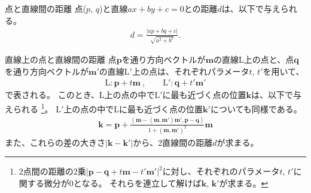 \clearpage
\begin{Formula}{点と直線間の距離}
点($p$, $q$)と直線$ax+by+c=0$との距離$d$は、以下で与えられる。
\begin{align*}
  d = \frac{|ap+bq+c|}{\sqrt{a^2+b^2}}.
\end{align*}
\end{Formula}
\begin{Formula}{直線上の点と直線間の距離}
点$\boldsymbol p$を通り方向ベクトルが$\boldsymbol m$の直線L上の点と、点$\boldsymbol q$を通り方向ベクトルが$\boldsymbol m'$の直線$\mathrm L'$上の点は、それぞれパラメータ$t$, $t'$を用いて、
\begin{align*}
  \mathrm L: \boldsymbol p+t\boldsymbol m\ , \qquad
  \mathrm L': \boldsymbol q+t'\boldsymbol m'
\end{align*}
で表される。
このとき、L上の点の中で$\mathrm L'$に最も近づく点の位置$\boldsymbol k$は、以下で与えられる
\footnote{2点間の距離の2乗$|\boldsymbol p-\boldsymbol q+t\boldsymbol m-t'\boldsymbol m'|^2$に対し、それぞれのパラメータ$t$, $t'$に関する微分が0となる。
それらを連立して解けば$\boldsymbol k$, $\boldsymbol k'$が求まる。}。
$\mathrm L'$上の点の中でLに最も近づく点の位置$\boldsymbol k'$についても同様である。
\begin{align*}
  \boldsymbol k
  = \boldsymbol p
    +\frac{(\boldsymbol m-(\boldsymbol m, \boldsymbol m')\boldsymbol m', \boldsymbol p-\boldsymbol q)}
          {1+(\boldsymbol m, \boldsymbol m')^2}\boldsymbol m
\end{align*}
また、これらの差の大きさ$\left|\boldsymbol k-\boldsymbol k'\right|$から、2直線間の距離$d$が求まる。
\end{Formula}
